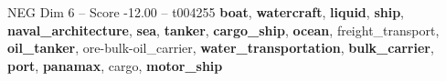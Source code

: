 \begin{textsample}{NEG Dim 6 – Score -12.00 – t004255}  \label{ex:f6_neg_005}
\textbf{boat}, \textbf{watercraft}, \textbf{liquid}, \textbf{ship}, \textbf{naval\_architecture}, \textbf{sea}, \textbf{tanker}, \textbf{cargo\_ship}, \textbf{ocean}, freight\_transport, \textbf{oil\_tanker}, ore-bulk-oil\_carrier, \textbf{water\_transportation}, \textbf{bulk\_carrier}, \textbf{port}, \textbf{panamax}, cargo, \textbf{motor\_ship}

\end{textsample}
